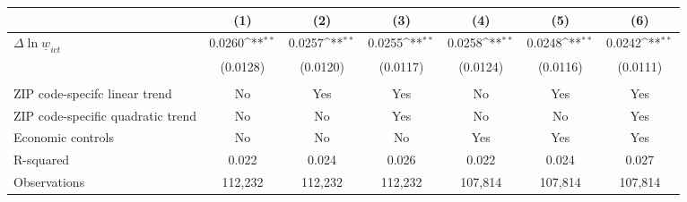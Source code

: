 {
\def\sym#1{\ifmmode^{#1}\else\(^{#1}\)\fi}
\begin{tabular}{l*{6}{c}}
\hline\hline
          &\multicolumn{1}{c}{(1)}         &\multicolumn{1}{c}{(2)}         &\multicolumn{1}{c}{(3)}         &\multicolumn{1}{c}{(4)}         &\multicolumn{1}{c}{(5)}         &\multicolumn{1}{c}{(6)}         \\
\hline
$\Delta \ln \underline{w}_{ict}$&   0.0260\sym{**} &   0.0257\sym{**} &   0.0255\sym{**} &   0.0258\sym{**} &   0.0248\sym{**} &   0.0242\sym{**} \\
          & (0.0128)         & (0.0120)         & (0.0117)         & (0.0124)         & (0.0116)         & (0.0111)         \\
\hline
\vspace{-2mm}&                  &                  &                  &                  &                  &                  \\
ZIP code-specifc linear trend&       No         &      Yes         &      Yes         &       No         &      Yes         &      Yes         \\
ZIP code-specific quadratic trend&       No         &       No         &      Yes         &       No         &       No         &      Yes         \\
Economic controls&       No         &       No         &       No         &      Yes         &      Yes         &      Yes         \\
R-squared &    0.022         &    0.024         &    0.026         &    0.022         &    0.024         &    0.027         \\
Observations&  112,232         &  112,232         &  112,232         &  107,814         &  107,814         &  107,814         \\
\hline\hline
\end{tabular}
}
